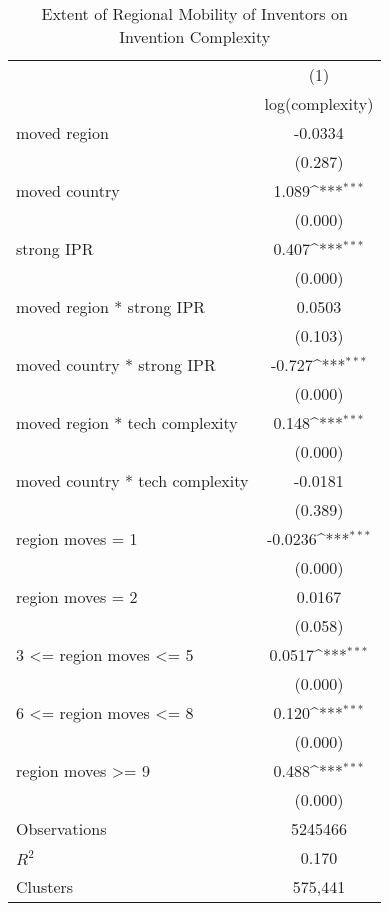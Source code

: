 {
\def\sym#1{\ifmmode^{#1}\else\(^{#1}\)\fi}
\begin{longtable}{l*{1}{c}}
\caption{Extent of Regional Mobility of Inventors on Invention Complexity \label{model5a}}\\
\hline\hline\endfirsthead\hline\endhead\hline\endfoot\endlastfoot
                &\multicolumn{1}{c}{(1)}\\
                &\multicolumn{1}{c}{log(complexity)}\\
\hline
moved region    &  -0.0334         \\
                &  (0.287)         \\
moved country   &    1.089\sym{***}\\
                &  (0.000)         \\
strong IPR      &    0.407\sym{***}\\
                &  (0.000)         \\
moved region * strong IPR&   0.0503         \\
                &  (0.103)         \\
moved country * strong IPR&   -0.727\sym{***}\\
                &  (0.000)         \\
moved region * tech complexity&    0.148\sym{***}\\
                &  (0.000)         \\
moved country * tech complexity&  -0.0181         \\
                &  (0.389)         \\
region moves = 1&  -0.0236\sym{***}\\
                &  (0.000)         \\
region moves = 2&   0.0167         \\
                &  (0.058)         \\
3 <= region moves <= 5&   0.0517\sym{***}\\
                &  (0.000)         \\
6 <= region moves <= 8&    0.120\sym{***}\\
                &  (0.000)         \\
region moves >= 9&    0.488\sym{***}\\
                &  (0.000)         \\
\hline
Observations    &  5245466         \\
$R^2$              &    0.170         \\
Clusters         &  575,441         \\

\end{longtable}}
